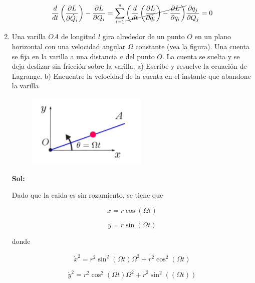 \documentclass[12pt,a4paper]{article}
\begin{document}
\begin{enumerate}
    \begin{equation*}
        \frac{d}{dt} \left(\frac{\partial L}{\partial \dot{Q}_i}\right) - \frac{\partial L}{\partial Q_i} = \sum_{i=1}^{s}\cancel{\left(\frac{d}{dt}  \left(\frac{\partial L}{\partial \dot{q}_i}  \right) - \frac{\partial L}{\partial q_i}\right)} \frac{\partial q_j}{\partial Q_j} = 0 
    \end{equation*}
    
    
    
    
    
    
    \item Una varilla $OA$ de longitud $l$ gira alrededor de un punto $O$ en un plano horizontal con una velocidad angular $\Omega$ constante (vea la figura). Una cuenta se fija en la varilla a una distancia $a$ del punto $O$. La cuenta se suelta y se deja deslizar sin fricción sobre la varilla.
    a) Escribe y resuelve la ecuación de Lagrange. b) Encuentre la velocidad de la cuenta en el instante que abandone la varilla 
    
    \begin{figure}[h!]
        \centering
        \includegraphics{1.PNG}
    \end{figure}
    
    \textbf{Sol:}
    
    Dado que la caida es sin rozamiento, se tiene que
    
    \begin{equation*}
        x = r \cos{(\Omega t)}
    \end{equation*}
    
    \begin{equation*}
        y = r \sin{(\Omega t)}
    \end{equation*}
    
    donde
    
    \begin{equation*}
        \dot{x}^2 = r^2 \sin^2{(\Omega t)} \Omega^2 + \dot{r^2} \cos^2{(\Omega t)}
    \end{equation*}
    
    \begin{equation*}
        \dot{y}^2 = r^2 \cos^2{(\Omega t)} \Omega^2  + \dot{r}^2 \sin^2{((\Omega t))}
    \end{equation*}
    

\end{enumerate}
\end{document}
